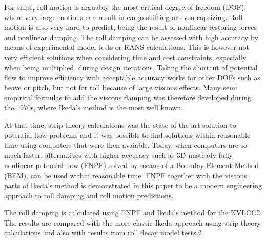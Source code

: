 For ships, roll motion is arguably the most critical degree of freedom (DOF), where very large motions can result in cargo shifting or even capsizing. Roll motion is also very hard to predict, being the result of nonlinear restoring forces and nonlinear damping. The roll damping can be assessed with high accuracy by means of experimental model tests or RANS calculations. This is however not very efficient solutions when considering time and cost constraints, especially when being multiplied, during design iterations. Taking the shortcut of potential flow to improve efficiency with acceptable accuracy works for other DOFs such as heave or pitch, but not for roll because of large viscous effects. Many semi empirical formulas to add the viscous damping was therefore developed during the 1970s, where Ikeda's method is the most well known.  

At that time, strip theory calculations was the state of the art solution to potential flow problems and it was possible to find solutions within reasonable time using computers that were then avaiable. Today, when computers are so much faster, alternatives with higher accuracy such as 3D unsteady fully nonlinear potential flow (FNPF) solved by means of a Bounday Element Method (BEM), can be used within reasonable time. FNPF together with the viscous parts of Ikeda's method is demonstrated in this paper to be a modern engineering approach to roll damping and roll motion predictions.

The roll damping is calculated using FNPF and Ikeda's method for the KVLCC2. The results are compared with the more classic Ikeda approach using strip theory calculations and also with results from roll decay model tests.ß   



